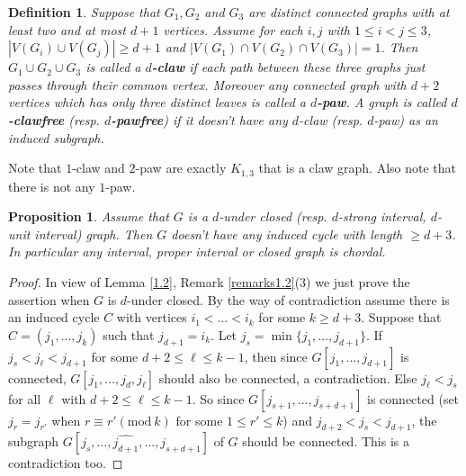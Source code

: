 \documentclass[12pt,reqno]{amsart}
\theoremstyle{plain}
\newtheorem{proposition}[theorem]{Proposition}
\newtheorem{definition}[theorem]{Definition}
\theoremstyle{definition}
\numberwithin{equation}{section}
\begin{document}
\begin{definition}
Suppose that $G_1, G_2$ and $G_3$ are distinct connected graphs with at least two and at most $d+1$ vertices. Assume for each $i,j$ with $1\leq i<j\leq 3$, $|V(G_i)\cup V(G_j)| \geq d+1$ and $|V(G_1)\cap V(G_2) \cap V(G_3)|=1$. Then $G_1\cup G_2 \cup G_3$ is called a \textbf{$d$-claw} if each path between these three graphs just passes through their common vertex. Moreover any connected graph with $d+2$ vertices which has only three distinct leaves is called a \textbf{$d$-paw}. A graph is called \textbf{$d$-clawfree} (resp. \textbf{$d$-pawfree}) if it doesn't have any $d$-claw (resp. $d$-paw) as an induced subgraph.
\end{definition}
Note that $1$-claw and $2$-paw are exactly $K_{1,3}$ that is a claw graph. Also note that there is not any $1$-paw. 
\begin{proposition}\label{1.5}
Assume that $G$ is a $d$-under closed (resp. $d$-strong interval, $d$-unit interval) graph. Then $G$ doesn't have any induced cycle with length $\geq d+3$. In particular any interval, proper interval or closed graph is chordal.
\end{proposition}
\begin{proof}
In view of Lemma \ref{1.2}, Remark \ref{remarks1.2}(3) we just prove the assertion when $G$ is $d$-under closed. By the way of contradiction assume there is an induced cycle $C$ with vertices $i_1<\dots <i_k$ for some $k\geq d+3$. Suppose that $C=(j_1, \dots, j_k)$ such that $j_{d+1}=i_{k}$. Let $j_s=\min \{j_1, \dots , j_{d+1}\}$. If $j_s<j_\ell <j_{d+1}$ for some $d+2\leq \ell \leq k-1$, then since $G[j_1, \dots , j_{d+1}]$ is connected, $G[j_1, \dots , j_d, j_\ell]$ should also be connected, a contradiction. Else $j_\ell <j_s$ for all $\ell$ with $d+2\leq \ell \leq k-1$. So since $G[j_{s+1}, \dots , j_{s+d+1}]$ is connected (set $j_r=j_{r '}$ when $r\equiv r' (\text{mod} \ k)$ for some $1\leq r' \leq k$) and $j_{d+2}<j_s < j_{d+1}$, the subgraph $G[j_s, \dots , \widehat{j_{d+1}}, \dots , j_{s+d+1}]$ of $G$ should be connected. This is a contradiction too.
\end{proof}
\end{document}
